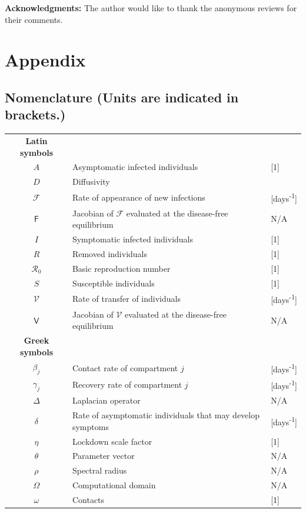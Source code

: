 \documentclass[11pt]{article}
\newcommand{\Ro}{\mathcal{R}_0}
\newcommand{\mat}[1]{\mathsf{#1}}
\begin{document}
	\vspace{0.5cm}
	
	\noindent \textbf{Acknowledgments:} The author would like to thank the anonymous reviews for their comments.

\section*{Appendix}
	\subsection*{Nomenclature (Units are indicated in brackets.)}
		\begin{longtable}{c l l}
			\textbf{Latin symbols} & & \\
			$A$ & Asymptomatic infected individuals & [1] \\
			$D$ & Diffusivity & \\
			$\mathcal{F}$ & Rate of appearance of new infections & [days\textsuperscript{-1}] \\
			$\mat{F}$ & Jacobian of $\mathcal{F}$ evaluated at the disease-free equilibrium & N/A \\
			$I$ & Symptomatic infected individuals & [1] \\
			$R$ & Removed individuals & [1] \\
			$\Ro$ & Basic reproduction number & [1] \\
			$S$ & Susceptible individuals & [1] \\
			$\mathcal{V}$ & Rate of transfer of individuals & [days\textsuperscript{-1}] \\
			$\mat{V}$ & Jacobian of $\mathcal{V}$ evaluated at the disease-free equilibrium & N/A \\
			\textbf{Greek symbols} & & \\
			$\beta_j$ & Contact rate of compartment $j$ & [days\textsuperscript{-1}] \\
			$\gamma_j$ & Recovery rate of compartment $j$ & [days\textsuperscript{-1}] \\
			$\Delta$ & Laplacian operator & N/A \\
			$\delta$ & Rate of asymptomatic individuals that may develop symptoms & [days\textsuperscript{-1}] \\
			$\eta$ & Lockdown scale factor & [1] \\
			$\theta$ & Parameter vector & N/A \\
			$\rho$ & Spectral radius & N/A \\
			$\Omega$ & Computational domain & N/A \\
			$\omega$ & Contacts & [1]
		\end{longtable}
	
\end{document}
